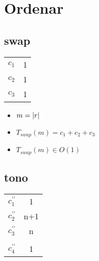 \documentclass{article}
\begin{document}
    \section*{Ordenar}

    \subsection*{swap}

    \begin{minipage}{0.70\textwidth}
        
    \end{minipage}
    \hfill
    \begin{minipage}{0.25\textwidth}
        \begin{tabular}{|c|c}
            $c_1$ & 1 \\
            $c_2$ & 1 \\
            $c_3$ & 1 \\
        \end{tabular}
    \end{minipage}

    \begin{itemize}
        \item $m = |r|$
        \item $T_{swap}(m) = c_1 + c_2 + c_3 $
        \item $T_{swap}(m) \in O(1)$
    \end{itemize}

    \subsection*{tono}

    \begin{minipage}{0.70\textwidth}
        
    \end{minipage}
    \hfill
    \begin{minipage}{0.25\textwidth}
        \begin{tabular}{|c|c}

            $c^{\prime\prime}_1$ & 1 \\
            $c^{\prime\prime}_2$ & n+1 \\
            $c^{\prime\prime}_3$ & n \\
            $                  $ &   \\
            $c^{\prime\prime}_4$ & 1 \\

        \end{tabular}
    \end{minipage}
\end{document}
